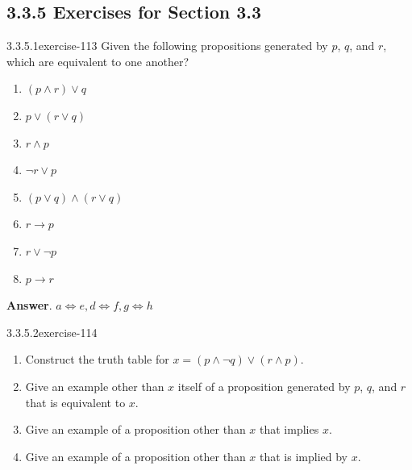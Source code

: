 \documentclass[twoside,10pt,]{book}
\numberwithin{equation}{section}
\begin{document}
\subsection*{3.3.5 Exercises for Section 3.3}
\begin{divisionsolution}{3.3.5.1}{}{exercise-113}%
\hypertarget{p-1021}{}%
Given the following propositions generated by \(p\), \(q\), and \(r\), which are equivalent to one another?\leavevmode%
\begin{multicols}{2}
\begin{enumerate}[label=(\alph*)]
\item\hypertarget{li-563}{}\hypertarget{p-1022}{}%
\((p \land  r) \lor  q\)%
\item\hypertarget{li-564}{}\hypertarget{p-1023}{}%
\(p\lor (r\lor q)\)%
\item\hypertarget{li-565}{}\hypertarget{p-1024}{}%
\(r \land  p\)%
\item\hypertarget{li-566}{}\hypertarget{p-1025}{}%
\(\neg r \lor  p\)%
\item\hypertarget{li-567}{}\hypertarget{p-1026}{}%
\((p\lor q)\land (r\lor  q)\)%
\item\hypertarget{li-568}{}\hypertarget{p-1027}{}%
\(r\to  p\)%
\item\hypertarget{li-569}{}\hypertarget{p-1028}{}%
\(r \lor  \neg p\)%
\item\hypertarget{li-570}{}\hypertarget{p-1029}{}%
\(p\to r\)%
\end{enumerate}
\end{multicols}
%
\par\smallskip%
\noindent\textbf{Answer}.\quad%
\hypertarget{p-1030}{}%
\(a\Leftrightarrow e, d\Leftrightarrow f, g\Leftrightarrow h\)%
\end{divisionsolution}%
\begin{divisionsolution}{3.3.5.2}{}{exercise-114}%
\hypertarget{p-1031}{}%
\leavevmode%
\begin{enumerate}[label=(\alph*)]
\item\hypertarget{li-571}{}\hypertarget{p-1032}{}%
Construct the truth table for \(x= (p \land  \neg q) \lor  (r \land  p)\).%
\item\hypertarget{li-572}{}\hypertarget{p-1033}{}%
Give an example other than \(x\) itself of a proposition generated by \(p\), \(q\), and \(r\) that is equivalent to \(x\).%
\item\hypertarget{li-573}{}\hypertarget{p-1034}{}%
Give an example of a proposition other than \(x\) that implies \(x\).%
\item\hypertarget{li-574}{}\hypertarget{p-1035}{}%
Give an example of a proposition other than \(x\) that is implied by \(x\).%
\end{enumerate}
%
\end{divisionsolution}%
\end{document}
